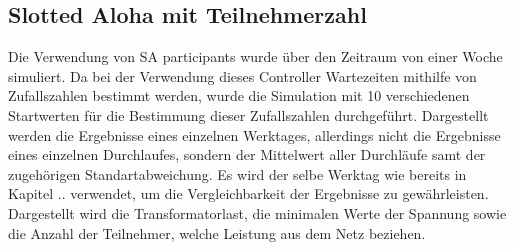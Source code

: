 \subsection{Slotted Aloha mit Teilnehmerzahl}
\label{chap_SApar}
Die Verwendung von SA participants wurde über den Zeitraum von einer Woche simuliert. Da bei der Verwendung dieses Controller Wartezeiten mithilfe von Zufallszahlen bestimmt werden, wurde die Simulation mit 10 verschiedenen Startwerten für die Bestimmung dieser Zufallszahlen durchgeführt. Dargestellt werden die Ergebnisse eines einzelnen Werktages, allerdings nicht die Ergebnisse eines einzelnen Durchlaufes, sondern der Mittelwert aller Durchläufe samt der zugehörigen Standartabweichung. Es wird der selbe Werktag wie bereits in Kapitel .. verwendet, um die Vergleichbarkeit der Ergebnisse zu gewährleisten. Dargestellt wird die Transformatorlast, die minimalen Werte der Spannung sowie die Anzahl der Teilnehmer, welche Leistung aus dem Netz beziehen. \\
